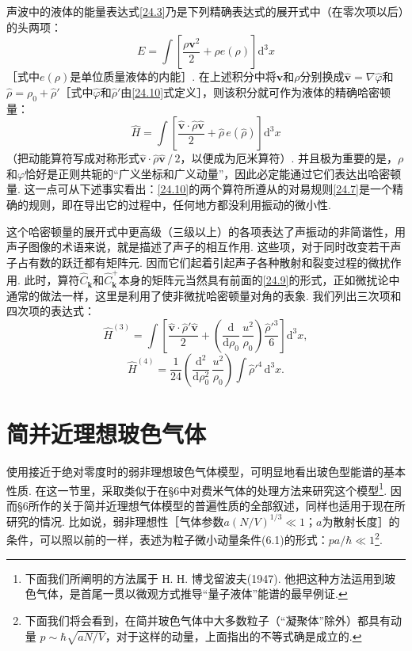声波中的液体的能量表达式\eqref{24.3}乃是下列精确表达式的展开式中（在零次项以后）的头两项：
\begin{equation*}
E=\int\left[\frac{\rho\bm{v}^{2}}{2}+\rho e(\rho)\right]\mathrm{d}^{3}x
\end{equation*}
［式中$e(\rho)$是单位质量液体的内能］. 在上述积分中将$\bm{v}$和$\rho$分别换成$\hat{\bm{v}}=\nabla\hat{\varphi}$和$\hat{\rho}=\rho_{0}+\hat{\rho}'$［式中$\hat{\varphi}$和$\hat{\rho}'$由\eqref{24.10}式定义］，则该积分就可作为液体的精确哈密顿量：
\begin{equation}
\hat{H}=\int\left[\frac{\hat{\bm{v}}\cdot\hat{\rho}\hat{\bm{v}}}{2}+\hat{\rho}\,e(\hat{\rho})\right]\mathrm{d}^{3}x
\label{24.11}
\end{equation}
（把动能算符写成对称形式$\hat{\bm{v}}\cdot\hat{\rho}\hat{\bm{v}}\,/\,2$，以便成为厄米算符）. 并且极为重要的是，$\rho$和$\varphi$恰好是正则共轭的“广义坐标和广义动量”，因此必定能通过它们表达出哈密顿量. 这一点可从下述事实看出：\eqref{24.10}的两个算符所遵从的对易规则\eqref{24.7}是一个精确的规则，即在导出它的过程中，任何地方都没利用振动的微小性.

这个哈密顿量的展开式中更高级（三级以上）的各项表达了声振动的非简谐性，用声子图像的术语来说，就是描述了声子的相互作用. 这些项，对于同时改变若干声子占有数的跃迁都有矩阵元. 因而它们起着引起声子各种散射和裂变过程的微扰作用. 此时，算符$\hat{C}_{\bm{k}}$和$\hat{C}^{+}_{\bm{k}}$本身的矩阵元当然具有前面的\eqref{24.9}的形式，正如微扰论中通常的做法一样，这里是利用了使非微扰哈密顿量对角的表象. 我们列出三次项和四次项的表达式：
\begin{equation}
\hat{H}^{(3)}=\int\left[\frac{\hat{\bm{v}}\cdot\hat{\rho}'\hat{\bm{v}}}{2}
+\left(\frac{\mathrm{d}}{\mathrm{d}\rho_{0}}\,\frac{u^{2}}{\rho_{0}}\right)\frac{\hat{\rho}'^{3}}{6}\right]\mathrm{d}^{3}x,
\label{24.12}
\end{equation}
\begin{equation}
\hat{H}^{(4)}=\frac{1}{24}\left(\frac{\mathrm{d}^{2}}{\mathrm{d}\rho_{0}^{2}}\,\frac{u^{2}}{\rho_{0}}\right)\int\hat{\rho}'^{4}\,\mathrm{d}^{3}x.
\label{24.13}
\end{equation}

\section{简并近理想玻色气体}

使用接近于绝对零度时的弱非理想玻色气体模型，可明显地看出玻色型能谱的基本性质. 在这一节里，采取类似于在§6中对费米气体的处理方法来研究这个模型\footnote{下面我们所阐明的方法属于 Н. Н. 博戈留波夫(1947). 他把这种方法运用到玻色气体，是首尾一贯以微观方式推导“量子液体”能谱的最早例证.}. 因而§6所作的关于简并近理想气体模型的普遍性质的全部叙述，同样也适用于现在所研究的情况. 比如说，弱非理想性［气体参数$a(N/V)^{1/3}\ll 1$；$a$为散射长度］的条件，可以照以前的一样，表述为粒子微小动量条件(6.1)的形式：$pa/\hbar\ll 1$\footnote{下面我们将会看到，在简并玻色气体中大多数粒子（“凝聚体”除外）都具有动量 $p\sim\hbar\sqrt{aN/V}$，对于这样的动量，上面指出的不等式确是成立的.}.

